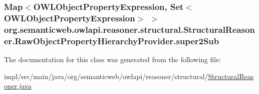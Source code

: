 \hypertarget{classorg_1_1semanticweb_1_1owlapi_1_1reasoner_1_1structural_1_1_structural_reasoner_1_1_raw_object_property_hierarchy_provider_a9df6fac71b291254dc58641b7b0f0edc}{
\subsubsection[{super2\-Sub}]{\setlength{\rightskip}{0pt plus 5cm}Map$<${\bf O\-W\-L\-Object\-Property\-Expression}, Set$<${\bf O\-W\-L\-Object\-Property\-Expression}$>$ $>$ org.\-semanticweb.\-owlapi.\-reasoner.\-structural.\-Structural\-Reasoner.\-Raw\-Object\-Property\-Hierarchy\-Provider.\-super2\-Sub\hspace{0.3cm}{\ttfamily [private]}}}\label{classorg_1_1semanticweb_1_1owlapi_1_1reasoner_1_1structural_1_1_structural_reasoner_1_1_raw_object_property_hierarchy_provider_a9df6fac71b291254dc58641b7b0f0edc}


The documentation for this class was generated from the following file\-:\begin{DoxyCompactItemize}
\item 
impl/src/main/java/org/semanticweb/owlapi/reasoner/structural/\hyperlink{_structural_reasoner_8java}{Structural\-Reasoner.\-java}\end{DoxyCompactItemize}
